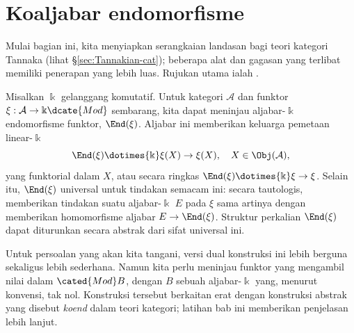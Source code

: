 
\section{Koaljabar endomorfisme}\label{sec:coend}
\hypertarget{o014.aljabr2.chapter9.coendomorphism-coalgebra-a}{ }
Mulai bagian ini, kita menyiapkan serangkaian landasan bagi teori kategori
Tannaka (lihat \S\ref{sec:Tannakian-cat}); beberapa alat dan gagasan yang
terlibat memiliki penerapan yang lebih luas. Rujukan utama ialah
\cite{Del90}.

Misalkan $\Bbbk$ gelanggang komutatif. Untuk kategori $\mathcal{A}$ dan
funktor $\xi:\mathcal{A}\to\Bbbk\dcate{Mod}$ sembarang, kita dapat meninjau
aljabar-$\Bbbk$ endomorfisme funktor, $\End(\xi)$. Aljabar ini memberikan
keluarga pemetaan linear-$\Bbbk$
\[ \End(\xi) \dotimes{\Bbbk} \xi(X) \to \xi(X), \quad X \in \Obj(\mathcal{A}), \]
yang funktorial dalam $X$, atau secara ringkas
$\End(\xi)\dotimes{\Bbbk}\xi\to\xi$. Selain itu, $\End(\xi)$ universal
untuk tindakan semacam ini: secara tautologis, memberikan tindakan suatu
aljabar-$\Bbbk$ $E$ pada $\xi$ sama artinya dengan memberikan
homomorfisme aljabar $E\to\End(\xi)$. Struktur perkalian $\End(\xi)$ dapat
diturunkan secara abstrak dari sifat universal ini.

Untuk persoalan yang akan kita tangani, versi dual konstruksi ini lebih
berguna sekaligus lebih sederhana. Namun kita perlu meninjau funktor yang
mengambil nilai dalam $\cated{Mod}B$, dengan $B$ sebuah aljabar-$\Bbbk$
yang, menurut konvensi, tak nol. Konstruksi tersebut berkaitan erat dengan
konstruksi abstrak yang disebut \emph{koend} dalam teori kategori; latihan
bab ini memberikan penjelasan lebih lanjut.

